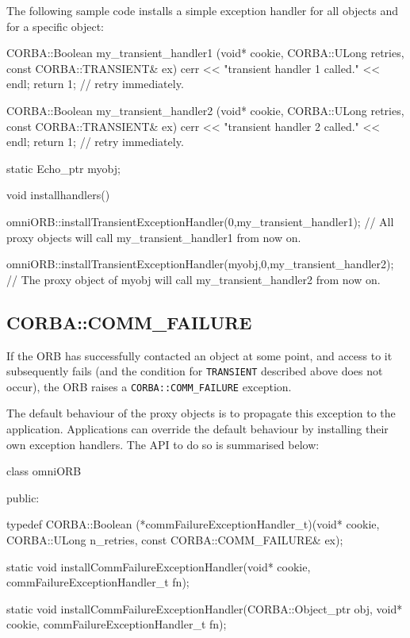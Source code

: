 \documentclass[11pt,twoside,a4paper]{book}
\newcommand{\code}[1]{\texttt{#1}}
\begin{document}
The following sample code installs a simple exception handler for all
objects and for a specific object:

\begin{cxxlisting}
CORBA::Boolean my_transient_handler1 (void* cookie,
                                      CORBA::ULong retries,
                                      const CORBA::TRANSIENT& ex)
{
   cerr << "transient handler 1 called." << endl;
   return 1;           // retry immediately.
}
 
CORBA::Boolean my_transient_handler2 (void* cookie,
                                      CORBA::ULong retries,
                                      const CORBA::TRANSIENT& ex)
{
   cerr << "transient handler 2 called." << endl;
   return 1;           // retry immediately.
}


static Echo_ptr myobj;

void installhandlers()
{
   omniORB::installTransientExceptionHandler(0,my_transient_handler1);
   // All proxy objects will call my_transient_handler1 from now on.

   omniORB::installTransientExceptionHandler(myobj,0,my_transient_handler2);
   // The proxy object of myobj will call my_transient_handler2 from now on.
}
\end{cxxlisting}


\subsection{CORBA::COMM\_FAILURE}

If the ORB has successfully contacted an object at some point, and
access to it subsequently fails (and the condition for
\code{TRANSIENT} described above does not occur), the ORB raises a
\code{CORBA::COMM\_FAILURE} exception.

The default behaviour of the proxy objects is to propagate this
exception to the application. Applications can override the default
behaviour by installing their own exception handlers. The API to do so
is summarised below:

\begin{cxxlisting}
class omniORB {
public:

typedef CORBA::Boolean (*commFailureExceptionHandler_t)(void* cookie,
                                                CORBA::ULong n_retries,
                                                const CORBA::COMM_FAILURE& ex);

static void installCommFailureExceptionHandler(void* cookie,
                                             commFailureExceptionHandler_t fn);

static void installCommFailureExceptionHandler(CORBA::Object_ptr obj,
                                             void* cookie,
                                             commFailureExceptionHandler_t
                                             fn);
}
\end{cxxlisting}
\end{document}
